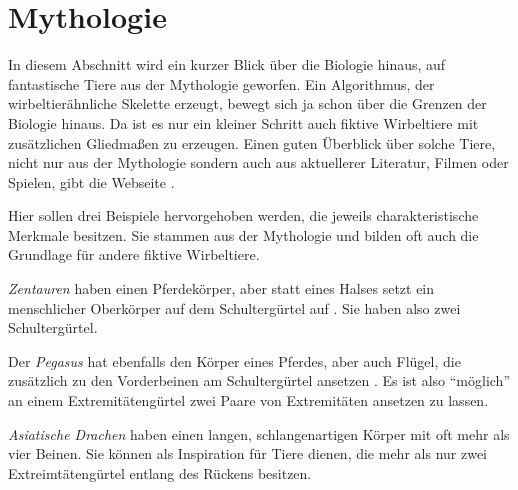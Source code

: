 \section{Mythologie}
\label{biology_mythology}

In diesem Abschnitt wird ein kurzer Blick über die Biologie hinaus, auf fantastische Tiere aus der Mythologie geworfen. 
Ein Algorithmus, der wirbeltierähnliche Skelette erzeugt, bewegt sich ja schon über die Grenzen der Biologie hinaus. Da ist es nur ein kleiner Schritt auch fiktive Wirbeltiere mit zusätzlichen Gliedmaßen zu erzeugen.
Einen guten Überblick über solche Tiere, nicht nur aus der Mythologie sondern auch aus aktuellerer Literatur, Filmen oder Spielen, gibt die Webseite \cite{vertebrateExtraLimbs}.

Hier sollen drei Beispiele hervorgehoben werden, die jeweils charakteristische Merkmale besitzen. Sie stammen aus der Mythologie und bilden oft auch die Grundlage für andere fiktive Wirbeltiere.

\emph{Zentauren} haben einen Pferdekörper, aber statt eines Halses setzt ein menschlicher Oberkörper auf dem Schultergürtel auf \cite{centaurs}. Sie haben also zwei Schultergürtel. 

Der \emph{Pegasus} hat ebenfalls den Körper eines Pferdes, aber auch Flügel, die zusätzlich zu den Vorderbeinen am Schultergürtel ansetzen \cite{pegasus}. Es ist also "`möglich"' an einem Extremitätengürtel zwei Paare von Extremitäten ansetzen zu lassen.

\emph{Asiatische Drachen} haben einen langen, schlangenartigen Körper mit oft mehr als vier Beinen. Sie können als Inspiration für Tiere dienen, die mehr als nur zwei Extreimtätengürtel entlang des Rückens besitzen.

